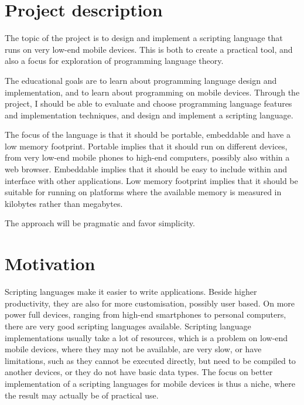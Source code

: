 \documentclass[11pt]{report}
\begin{document}
\section{Project description}
    The topic of the project is to design and implement a scripting language
that runs on very low-end mobile devices. This is both to create a practical tool, and
also a focus for exploration of programming language theory. 

\begin{comment}
The motivation is that a scripting language makes it is easier to make applications for mobile 
devices, and that existing freely available scripting languages
are very limited, slow, or simply does not run on the low-end mobile devices.
\end{comment}

    The educational goals are to learn about programming language design and
implementation, and to learn about programming on mobile devices. Through the
project, I should be able to evaluate and choose programming language features
and implementation techniques, and design and implement a scripting language.

    The focus of the language is that it should be portable, embeddable and have
a low memory footprint. Portable implies that it should run on different devices,
from very low-end mobile phones to high-end computers, possibly also within a web browser. 
Embeddable implies that it should be easy to include within and interface with
other applications. Low memory footprint implies that it should be suitable for
running on platforms where the available memory is measured in kilobytes rather
than megabytes. 

    The approach will be pragmatic and favor simplicity.

\section{Motivation}

Scripting languages make it easier to write applications\cite{scripting-ousterhout}. Beside higher productivity, they are also for more customisation, possibly user based.
On more power full devices, ranging from high-end smartphones to personal computers, there are very good scripting languages available.
Scripting language implementations usually take a lot of resources, which is a problem on low-end mobile devices, where they may not be available, are very slow, or have limitations, such as they cannot be executed directly, but need to be compiled to another devices, or they do not have basic data types.
The focus on better implementation of a scripting languages for mobile devices is thus a niche, where the result may actually be of practical use.
\end{document}
